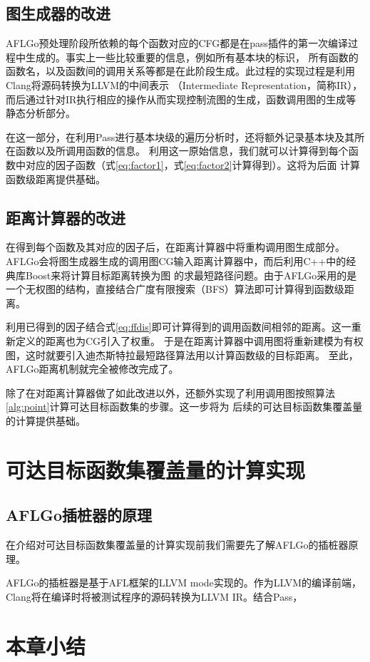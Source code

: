 \documentclass[bachelor]{njupthesis}
\begin{document}
\subsection{图生成器的改进}
AFLGo预处理阶段所依赖的每个函数对应的CFG都是在pass插件的第一次编译过程中生成的。事实上一些比较重要的信息，例如所有基本块的标识，
所有函数的函数名，以及函数间的调用关系等都是在此阶段生成。此过程的实现过程是利用Clang\cite{Clang}将源码转换为LLVM的中间表示
（Intermediate Representation，简称IR），而后通过针对IR执行相应的操作从而实现控制流图的生成，函数调用图的生成等静态分析部分。

在这一部分，在利用Pass进行基本块级的遍历分析时，还将额外记录基本块及其所在函数以及所调用函数的信息。
利用这一原始信息，我们就可以计算得到每个函数中对应的因子函数（式\ref{eq:factor1}，式\ref{eq:factor2}计算得到）。这将为后面
计算函数级距离提供基础。

\subsection{距离计算器的改进}
在得到每个函数及其对应的因子后，在距离计算器中将重构调用图生成部分。
AFLGo会将图生成器生成的调用图CG输入距离计算器中，而后利用C++中的经典库Boost\cite{Boost}来将计算目标距离转换为图
的求最短路径问题。由于AFLGo采用的是一个无权图的结构，直接结合广度有限搜索（BFS）算法即可计算得到函数级距离。

利用已得到的因子结合式\ref{eq:ffdis}即可计算得到的调用函数间相邻的距离。这一重新定义的距离也为CG引入了权重。
于是在距离计算器中调用图将重新建模为有权图，这时就要引入迪杰斯特拉最短路径算法用以计算函数级的目标距离。
至此，AFLGo距离机制就完全被修改完成了。

除了在对距离计算器做了如此改进以外，还额外实现了利用调用图按照算法\ref{alg:point}计算可达目标函数集的步骤。这一步将为
后续的可达目标函数集覆盖量的计算提供基础。

\section{可达目标函数集覆盖量的计算实现}
\subsection{AFLGo插桩器的原理}
在介绍对可达目标函数集覆盖量的计算实现前我们需要先了解AFLGo的插桩器原理。

AFLGo的插桩器是基于AFL框架的LLVM mode实现的。作为LLVM的编译前端，Clang将在编译时将被测试程序的源码转换为LLVM IR。结合Pass，

\section{本章小结}
\end{document}
